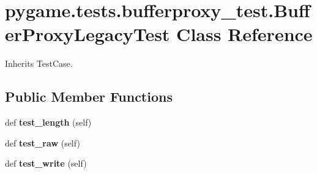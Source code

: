 \hypertarget{classpygame_1_1tests_1_1bufferproxy__test_1_1_buffer_proxy_legacy_test}{}\section{pygame.\+tests.\+bufferproxy\+\_\+test.\+Buffer\+Proxy\+Legacy\+Test Class Reference}
\label{classpygame_1_1tests_1_1bufferproxy__test_1_1_buffer_proxy_legacy_test}


Inherits Test\+Case.

\subsection*{Public Member Functions}
\begin{DoxyCompactItemize}
\item 
\mbox{\label{classpygame_1_1tests_1_1bufferproxy__test_1_1_buffer_proxy_legacy_test_ad99c51eeadbd8e6ceeee8b472ba64694}} 
def {\bfseries test\+\_\+length} (self)
\item 
\mbox{\label{classpygame_1_1tests_1_1bufferproxy__test_1_1_buffer_proxy_legacy_test_a5cd35110ce38e47344c7240c5cde6e33}} 
def {\bfseries test\+\_\+raw} (self)
\item 
\mbox{\label{classpygame_1_1tests_1_1bufferproxy__test_1_1_buffer_proxy_legacy_test_a29096fdf89eeaa4d42957997c19f5391}} 
def {\bfseries test\+\_\+write} (self)
\end{DoxyCompactItemize}
